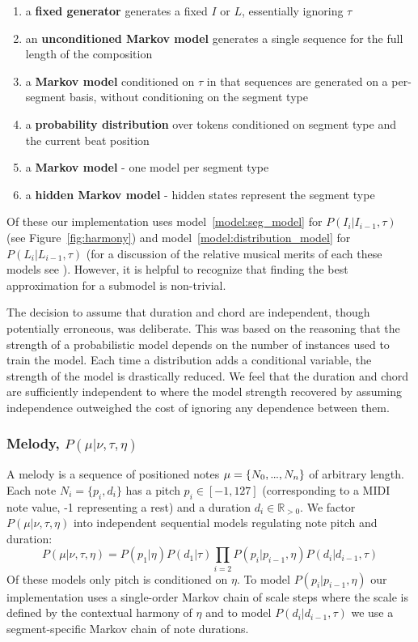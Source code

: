 \documentclass[letterpaper]{article}
\newcommand\mydots{\hbox to .75em{.\hss.\hss.}}
\begin{document}
\begin{enumerate}
\item a \textbf{fixed generator} generates a fixed $I$ or $L$, essentially ignoring $\tau$
\item an \textbf{unconditioned Markov model} generates a single sequence for the full length of the composition
\item a \textbf{Markov model} conditioned on $\tau$ in that sequences are generated on a per-segment basis, without conditioning on the segment type
\item \label{model:distribution_model}a \textbf{probability distribution} over tokens conditioned on segment type and the current beat position
\item \label{model:seg_model}a \textbf{Markov model} - one model per segment type
\item a \textbf{hidden Markov model} - hidden states represent the segment type
\end{enumerate}

Of these our implementation uses model~\ref{model:seg_model} for $P(I_i|I_{i-1},\tau)$ (see Figure~\ref{fig:harmony}) and model~\ref{model:distribution_model} for $P(L_i | L_{i-1},\tau)$ (for a discussion of the relative musical merits of each these models see \cite{bodily:inpress-a}). However, it is helpful to recognize that finding the best approximation for a submodel is non-trivial.

The decision to assume that duration and chord are independent, though potentially erroneous, was deliberate. This was based on the reasoning that the strength of a probabilistic model depends on the number of instances used to train the model. Each time a distribution adds a conditional variable, the strength of the model is drastically reduced. We feel that the duration and chord are sufficiently independent to where the model strength recovered by assuming independence outweighed the cost of ignoring any dependence between them.

\subsubsection{Melody, $P(\mu|\nu,\tau,\eta)$}

A melody is a sequence of positioned notes $\mu=\{N_0,\mydots,N_n\}$ of arbitrary length. Each note $N_i = \{p_i,d_i\}$ has a pitch $p_i\in[-1,127]$  (corresponding to a MIDI note value, -1 representing a rest) and a duration $d_i \in \mathbb{R}_{>0}$. We factor $P(\mu|\nu,\tau,\eta)$ into independent sequential models regulating note pitch and duration:
\[ P(\mu|\nu,\tau,\eta) = P(p_1|\eta) P(d_1|\tau) \prod_{i=2} P(p_i|p_{i-1},\eta) P(d_i|d_{i-1},\tau) \]
Of these models only pitch is conditioned on $\eta$. To model $P(p_i|p_{i-1},\eta)$ our implementation uses a single-order Markov chain of scale steps where the scale is defined by the contextual harmony of $\eta$ and to model $P(d_i|d_{i-1},\tau)$ we use a segment-specific Markov chain of note durations.
\end{document}

